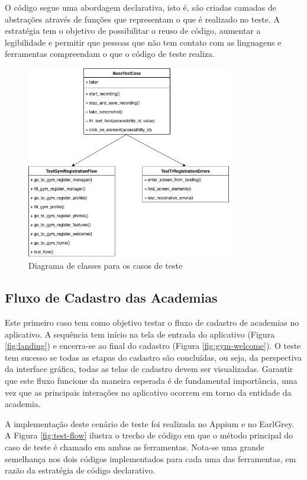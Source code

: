 O código segue uma abordagem declarativa, isto é, são criadas camadas de abstrações através de funções que representam o que é realizado no teste. A estratégia tem o objetivo de possibilitar o reuso de código, aumentar a legibilidade e permitir que pessoas que não tem contato com as linguagens e ferramentas compreendam o que o código de teste realiza.

\begin{figure}[H]
    \centering
    \includegraphics[width=0.8\textwidth]{pfc/figuras/class-diagram-tests.png}
    \caption{Diagrama de classes para os casos de teste}
    \label{fig:class-diagram-tests}
\end{figure}

\subsection{Fluxo de Cadastro das Academias}
Este primeiro caso tem como objetivo testar o fluxo de cadastro de academias no aplicativo. A sequência tem início na tela de entrada do aplicativo (Figura \ref{fig:landing}) e encerra-se ao final do cadastro (Figura \ref{fig:gym-welcome}). O teste tem sucesso se todas as etapas do cadastro são concluídas, ou seja, da perspectiva da interface gráfica, todas as telas de cadastro devem ser visualizadas. Garantir que este fluxo funcione da maneira esperada é de fundamental importância, uma vez que as principais interações no aplicativo ocorrem em torno da entidade da academia.

A implementação deste cenário de teste foi realizada no Appium e no EarlGrey. A Figura \ref{fig:test-flow} ilustra o trecho de código em que o método principal do caso de teste é chamado em ambas as ferramentas. Nota-se uma grande semelhança nos dois códigos implementados para cada uma das ferramentas, em razão da estratégia de código declarativo.

